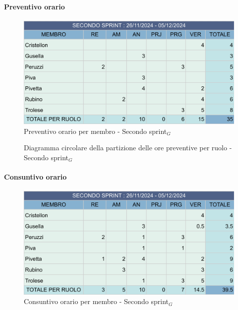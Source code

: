 \documentclass[10pt]{article}
\begin{document}
{{{    \paragraph{Preventivo orario}\mbox{}\vspace{0.4em}
    \begin{figure}[ht]
    	\centering
    	\includegraphics[width=0.6\linewidth]{preventivoOreSecondoSprint.png}
    	\caption{Preventivo orario per membro - Secondo sprint$_G$}
    	\label{fig:Preventivo orario per membro - Secondo sprint$_G$}
    \end{figure}

    \begin{figure}[H]
        \centering
        \caption{Diagramma circolare della partizione delle ore preventive per ruolo - Secondo sprint$_G$ }
        \label{fig:Diagramma circolare della partizione delle ore preventive per ruolo - Secondo sprint$_G$}
    \end{figure}
    
    \paragraph{Consuntivo orario}\mbox{}\vspace{0.4em}
    \begin{figure}[ht]
    	\centering
    	\includegraphics[width=0.6\linewidth]{consuntivoOreSecondoSprint.png}
    	\caption{Consuntivo orario per membro - Secondo sprint$_G$}
    	\label{fig:Consuntivo orario per membro - secondo sprint$_G$}
    \end{figure}

}}}
\end{document}

